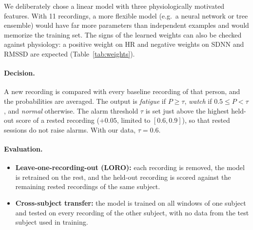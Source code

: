 \documentclass[11pt]{article}
\begin{document}
We deliberately chose a linear model with three physiologically motivated features. With 11 recordings, a
more flexible model (e.g.\ a neural network or tree ensemble) would have far more parameters than independent
examples and would memorize the training set. The signs of the learned weights can also be checked against
physiology: a positive weight on HR and negative weights on SDNN and RMSSD are expected
(Table~\ref{tab:weights}).

\paragraph{Decision.}
A new recording is compared with every baseline recording of that person, and the probabilities are averaged.
The output is \emph{fatigue} if $P\ge\tau$, \emph{watch} if $0.5\le P<\tau$, and \emph{normal} otherwise. The
alarm threshold $\tau$ is set just above the highest held-out score of a rested recording ($+0.05$, limited to
$[0.6, 0.9]$), so that rested sessions do not raise alarms. With our data, $\tau=0.6$.

\paragraph{Evaluation.}
\begin{itemize}
  \item \textbf{Leave-one-recording-out (LORO):} each recording is removed, the model is retrained on the
  rest, and the held-out recording is scored against the remaining rested recordings of the same subject.
  \item \textbf{Cross-subject transfer:} the model is trained on all windows of one subject and tested on
  every recording of the other subject, with no data from the test subject used in training.
\end{itemize}
\end{document}
